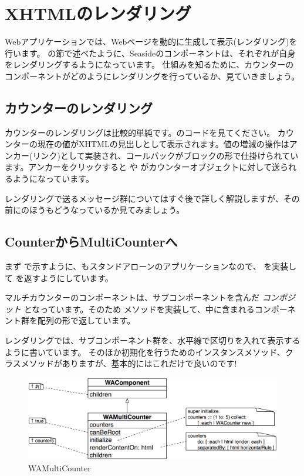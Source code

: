 \documentclass[a4paper,10pt,twoside]{book}
\begin{document}
\section{XHTMLのレンダリング}

Webアプリケーションでは、Webページを動的に生成して表示(レンダリング)を行います。 の節で述べたように、Seasideのコンポーネントは、それぞれが自身をレンダリングするようになっています。
仕組みを知るために、カウンターのコンポーネントがどのようにレンダリングを行っているか、見ていきましょう。

\subsection{カウンターのレンダリング}

カウンターのレンダリングは比較的単純です。のコードを見てください。
カウンターの現在の値がXHTMLの見出しとして表示されます。値の増減の操作はアンカー(リンク)として実装され、コールバックがブロックの形で仕掛けられています。アンカーをクリックすると  や がカウンターオブジェクトに対して送られるようになっています。

レンダリングで送るメッセージ群についてはすぐ後で詳しく解説しますが、その前にのほうもどうなっているか見てみましょう。

\subsection{CounterからMultiCounterへ}

まず で示すように、もスタンドアローンのアプリケーションなので、 を実装して を返すようにしています。

マルチカウンターのコンポーネントは、サブコンポーネントを含んだ \emph{コンポジット} となっています。そのため  メソッドを実装して、中に含まれるコンポーネント群を配列の形で返しています。

レンダリングでは、サブコンポーネント群を、水平線で区切りを入れて表示するように書いています。
そのほか初期化を行うためのインスタンスメソッド、クラスメソッドがありますが、基本的にはこれだけで良いのです!

\begin{figure}[bht]
\begin{center}
\includegraphics[width=\textwidth]{WAMultiCounter}
\caption{WAMultiCounter}
\end{center}
\end{figure}
\end{document}
